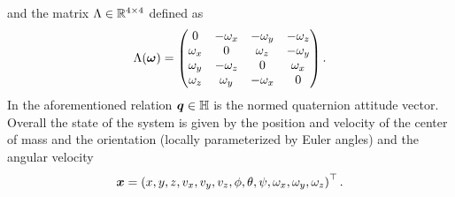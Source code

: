 and the matrix $\Lambda \in \mathbb{R}^{4 \times 4}$ defined as
\begin{equation*}
    \Lambda(\boldsymbol{\omega}) = \begin{pmatrix}
        0 & -\omega_x & -\omega_y & -\omega_z \\
        \omega_x & 0 & \omega_z & -\omega_y \\
        \omega_y & -\omega_z & 0 & \omega_x \\
        \omega_z & \omega_y & -\omega_x & 0
    \end{pmatrix}.
\end{equation*}
In the aforementioned relation $\boldsymbol{q} \in \mathbb{H}$ is the normed quaternion attitude vector.
Overall the state of the system is given by the position and velocity of the center of mass and the orientation
(locally parameterized by Euler angles) and the angular velocity
\begin{equation*}
    \boldsymbol{x} = \left( x, y, z, v_x, v_y, v_z, \phi, \theta, \psi, \omega_x, \omega_y, \omega_z \right)^{\top}.
\end{equation*}

